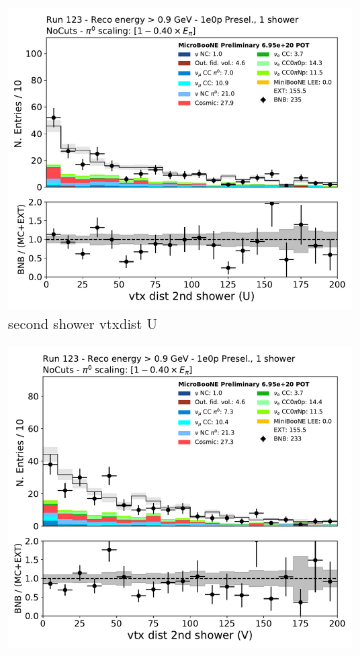 \begin{figure}[H]
    \centering
    \begin{subfigure}{0.3\textwidth}
    \includegraphics[width=1.0\textwidth]{1e0p/High_E_Sideband/secondshower_U_vtxdist.pdf}
    \caption{second shower vtxdist U}
    \end{subfigure}
    \begin{subfigure}{0.3\textwidth}
    \includegraphics[width=1.0\textwidth]{1e0p/High_E_Sideband/secondshower_V_vtxdist.pdf}

\end{subfigure}
\end{figure}
